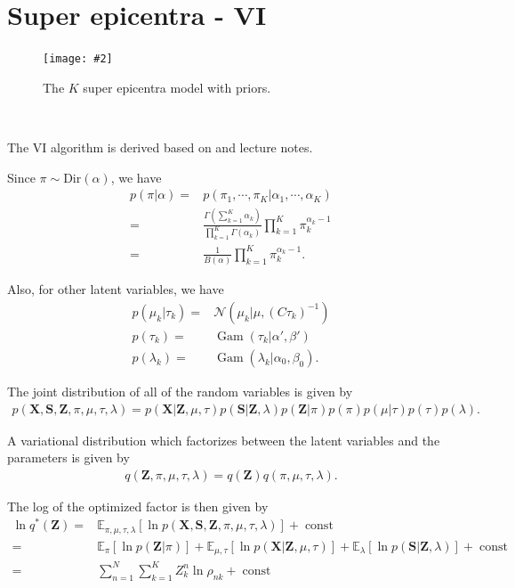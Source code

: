 \documentclass[11pt]{extarticle}
\newcommand{\N}{\mathcal{N}}
\renewcommand{\S}{\mathbf{S}}
\newcommand{\X}{\mathbf{X}}
\newcommand{\Z}{\mathbf{Z}}
\newcommand{\0}{\mathbf{0}}
\renewcommand{\(}{\left(}
\renewcommand{\)}{\right)}
\DeclareMathOperator{\const}{const}
\DeclareMathOperator{\Gam}{Gam}
\theoremstyle{definition}
\newcommand{\image}[3]{
	\begin{figure}[!ht]
		\centering
	    \texttt{[image: \#2]}
		\caption{#3}
		\label{fig:#2}
	\end{figure}
}
\begin{document}
\section{Super epicentra - VI}
\image{0.5}{Q2_2_6}{The $K$ super epicentra model with priors.}
\noindent{} \\
\par The VI algorithm is derived based on \cite{Bishop} and lecture notes.
\par Since $\pi \sim \mathrm{Dir}(\alpha)$, we have
\begin{align*}
	p(\pi \vert \alpha) =& p(\pi_{1}, \cdots, \pi_{K} \vert \alpha_{1}, \cdots, \alpha_{K}) \\
	=& \frac{\Gamma\left(\sum_{k=1}^{K} \alpha_{k}\right)}{\prod_{k=1}^{K}\Gamma(\alpha_{k})} \prod_{k=1}^{K} \pi_{k}^{\alpha_{k}-1} \\
	=& \frac{1}{B(\alpha)} \prod_{k=1}^{K} \pi_{k}^{\alpha_{k}-1}.
\end{align*}
\par Also, for other latent variables, we have
\begin{align*}
	p(\mu_{k} \vert \tau_{k}) =& \N(\mu_{k} \vert \mu, (C \tau_{k})^{-1}) \\
	p(\tau_{k}) =& \Gam(\tau_{k} \vert \alpha', \beta') \\
	p(\lambda_{k}) =& \Gam(\lambda_{k} \vert \alpha_{0}, \beta_{0}).
\end{align*}
\par The joint distribution of all of the random variables is given by
\begin{align*}
	p(\X, \S, \Z, \pi, \mu, \tau, \lambda) = p(\X|\Z,\mu,\tau) p(\S|\Z,\lambda) p(\Z|\pi) p(\pi) p(\mu|\tau) p(\tau) p(\lambda).
\end{align*}
\par A variational distribution which factorizes between the latent variables and the parameters is given by
\begin{align*}
	q(\Z, \pi, \mu, \tau, \lambda) = q(\Z) q(\pi, \mu, \tau, \lambda).
\end{align*}
\par The log of the optimized factor is then given by
\begin{align*}
	\ln q^{*}(\Z) =& \mathbb{E}_{\pi, \mu, \tau, \lambda}[\ln p(\X, \S, \Z, \pi, \mu, \tau, \lambda)] + \const \\
	=& \mathbb{E}_{\pi}[\ln p(\Z \vert \pi)] + \mathbb{E}_{\mu, \tau}[\ln p(\X \vert \Z, \mu, \tau)] + \mathbb{E}_{\lambda}[\ln p(\S \vert \Z, \lambda)] + \const \\
	=& \sum_{n=1}^{N}\sum_{k=1}^{K} Z^{n}_{k} \ln \rho_{nk} + \const
\end{align*}
\end{document}
